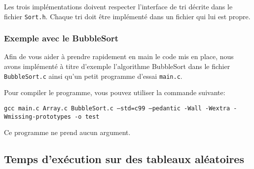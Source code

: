 \documentclass[a4paper,10pt]{article}
\begin{document}
Les trois implémentations doivent respecter l'interface de tri décrite dans le
fichier \texttt{Sort.h}. Chaque tri doit être implémenté dans un fichier qui lui
est propre.

\subsubsection*{Exemple avec le BubbleSort}

Afin de vous aider à prendre rapidement en main le code mis en place, nous avons
implémenté à titre d'exemple l'algorithme BubbleSort dans le fichier
\texttt{BubbleSort.c} ainsi qu'un petit programme d'essai \texttt{main.c}.

Pour compiler le programme, vous pouvez utiliser la commande suivante:

{\small \texttt{gcc main.c Array.c BubbleSort.c --std=c99 --pedantic -Wall -Wextra -Wmissing-prototypes -o test}}

Ce programme ne prend aucun argument.



\subsection{Temps d'exécution sur des tableaux aléatoires}
\end{document}
